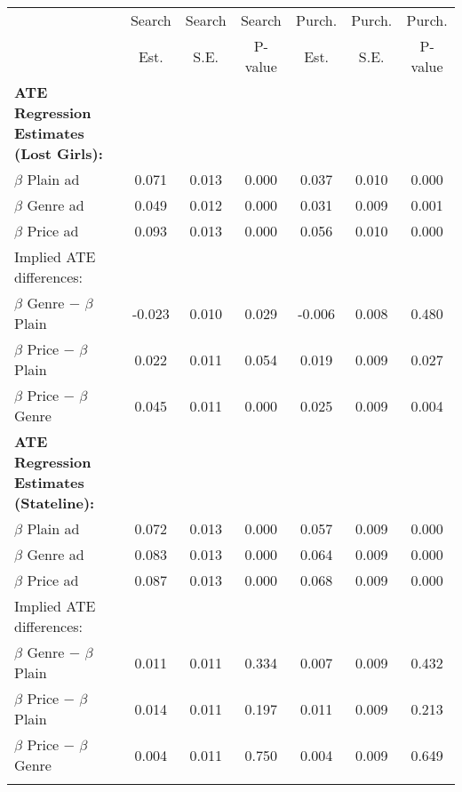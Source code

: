 \begin{center}
\begin{tabular}{lcccccc}
\hline \noalign{\smallskip} & Search & Search & Search & Purch. & Purch. & Purch.\\
 & Est. & S.E. & P-value & Est. & S.E. & P-value\\
\noalign{\smallskip}\hline \noalign{\smallskip}\textbf{ATE Regression Estimates (Lost Girls):} &  &  &  &  &  & \\
\hspace{5pt} $\beta$ Plain ad & 0.071 & 0.013 & 0.000 & 0.037 & 0.010 & 0.000\\
\hspace{5pt} $\beta$ Genre ad & 0.049 & 0.012 & 0.000 & 0.031 & 0.009 & 0.001\\
\hspace{5pt} $\beta$ Price ad & 0.093 & 0.013 & 0.000 & 0.056 & 0.010 & 0.000\\
Implied ATE differences: &  &  &  &  &  & \\
\hspace{5pt} $\beta$ Genre $-$ $\beta$ Plain & -0.023 & 0.010 & 0.029 & -0.006 & 0.008 & 0.480\\
\hspace{5pt} $\beta$ Price $-$ $\beta$ Plain & 0.022 & 0.011 & 0.054 & 0.019 & 0.009 & 0.027\\
\hspace{5pt} $\beta$ Price $-$ $\beta$ Genre & 0.045 & 0.011 & 0.000 & 0.025 & 0.009 & 0.004\\
\textbf{ATE Regression Estimates (Stateline):} &  &  &  &  &  & \\
\hspace{5pt} $\beta$ Plain ad & 0.072 & 0.013 & 0.000 & 0.057 & 0.009 & 0.000\\
\hspace{5pt} $\beta$ Genre ad & 0.083 & 0.013 & 0.000 & 0.064 & 0.009 & 0.000\\
\hspace{5pt} $\beta$ Price ad & 0.087 & 0.013 & 0.000 & 0.068 & 0.009 & 0.000\\
Implied ATE differences: &  &  &  &  &  & \\
\hspace{5pt} $\beta$ Genre $-$ $\beta$ Plain & 0.011 & 0.011 & 0.334 & 0.007 & 0.009 & 0.432\\
\hspace{5pt} $\beta$ Price $-$ $\beta$ Plain & 0.014 & 0.011 & 0.197 & 0.011 & 0.009 & 0.213\\
\hspace{5pt} $\beta$ Price $-$ $\beta$ Genre & 0.004 & 0.011 & 0.750 & 0.004 & 0.009 & 0.649\\
\noalign{\smallskip}\hline\end{tabular}\\
\end{center}
